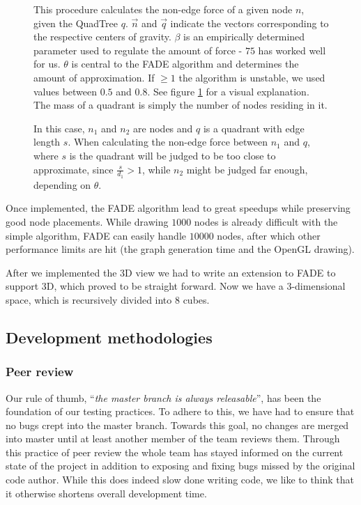 \documentclass[a4paper,11pt,titlepage]{article}
\begin{document}
\begin{figure}[ht]
  \begin{minipage}[b]{0.5\linewidth}
    
    \caption{This procedure calculates the non-edge force of a given
      node \(n\), given the QuadTree \(q\). \(\vec{n}\) and
      \(\vec{q}\) indicate the vectors corresponding to the respective
      centers of gravity. \(\beta\) is an empirically determined
      parameter used to regulate the amount of force - \(75\) has
      worked well for us. \(\theta\) is central to the FADE algorithm
      and determines the amount of approximation. If \(\geq 1\) the
      algorithm is unstable, we used values between \(0.5\) and
      \(0.8\). See figure \ref{fig:theta} for a visual
      explanation. The mass of a quadrant is simply the number of
      nodes residing in it. }
    \label{proc:FADE}
  \end{minipage}
  \hspace{10pt}
  \begin{minipage}[b]{0.5\linewidth}
    \centering
    
    \caption{In this case, \(n_1\) and \(n_2\) are nodes and \(q\) is
      a quadrant with edge length \(s\). When calculating the non-edge
      force between \(n_1\) and \(q\), where \(s\) is the quadrant
      will be judged to be too close to approximate, since
      \(\frac{s}{d_1} > 1\), while \(n_2\) might be judged far enough,
      depending on \(\theta\).}
    \label{fig:theta}
  \end{minipage}
\end{figure}

Once implemented, the FADE algorithm lead to great speedups while
preserving good node placements. While drawing \(1000\) nodes is
already difficult with the simple algorithm, FADE can easily handle
\(10000\) nodes, after which other performance limits are hit (the
graph generation time and the OpenGL drawing).

After we implemented the 3D view we had to write an extension to FADE to support
3D, which proved to be straight forward. Now we have a 3-dimensional space,
which is recursively divided into $8$ cubes.


\subsection{Development methodologies}

\subsubsection{Peer review}
Our rule of thumb, ``\emph{the master branch is always releasable}'',
has been
the foundation of our testing practices. To adhere to this, we have
had to ensure that no bugs crept into the master branch. Towards this
goal, no changes are merged into master until at least another member
of the team reviews them. Through this practice of peer review the
whole team has stayed informed on the current state of the project
in addition to exposing and fixing bugs missed by the original code
author. While this does indeed slow done writing code, we like to
think that it otherwise shortens overall development time.
\end{document}
